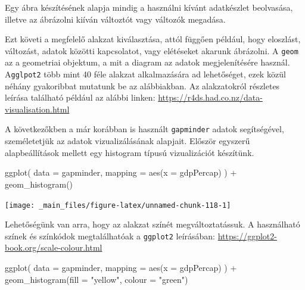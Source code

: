 \documentclass[
]{book}
\newenvironment{Shaded}{\begin{snugshade}}{\end{snugshade}}
\newcommand{\AttributeTok}[1]{\textcolor[rgb]{0.77,0.63,0.00}{#1}}
\newcommand{\FunctionTok}[1]{\textcolor[rgb]{0.00,0.00,0.00}{#1}}
\newcommand{\NormalTok}[1]{#1}
\newcommand{\SpecialCharTok}[1]{\textcolor[rgb]{0.00,0.00,0.00}{#1}}
\newcommand{\StringTok}[1]{\textcolor[rgb]{0.31,0.60,0.02}{#1}}
\begin{document}
Egy ábra készítésének alapja mindig a használni kívánt adatkészlet
beolvasása, illetve az ábrázolni kiíván változtót vagy változók
megadása.

Ezt követi a megfelelő alakzat kiválasztása, attól függően például, hogy
eloszlást, változást, adatok közötti kapcsolatot, vagy elétéseket
akarunk ábrázolni. A \texttt{geom} az a geometriai objektum, a mit a
diagram az adatok megjelenítésére használ. A\texttt{gglpot2} több mint
40 féle alakzat alkalmazására ad lehetőséget, ezek közül néhány
gyakoribbat mutatunk be az alábbiakban. Az alakzatokról részletes
leírása található például az alábbi linken:
\url{https://r4ds.had.co.nz/data-visualisation.html}

A következőkben a már korábban is használt \texttt{gapminder} adatok
segítségével, személetetjük az adatok vizualizálásának alapjait. Először
egyszerű alapbeállítások mellett egy histogram típusú vizualizációt
készítünk.

\begin{Shaded}
\begin{Highlighting}[]
\FunctionTok{ggplot}\NormalTok{(}
  \AttributeTok{data =}\NormalTok{ gapminder,}
  \AttributeTok{mapping =} \FunctionTok{aes}\NormalTok{(}\AttributeTok{x =}\NormalTok{ gdpPercap)}
\NormalTok{) }\SpecialCharTok{+}
  \FunctionTok{geom\_histogram}\NormalTok{()}
\end{Highlighting}
\end{Shaded}

\begin{center}\texttt{[image: \_main\_files/figure-latex/unnamed-chunk-118-1]} \end{center}

Lehetőségünk van arra, hogy az alakzat színét megváltoztatássuk. A
használható színek és színkódok megtalálhatóak a \texttt{ggplot2}
leírásában: \url{https://ggplot2-book.org/scale-colour.html}

\begin{Shaded}
\begin{Highlighting}[]
\FunctionTok{ggplot}\NormalTok{(}
  \AttributeTok{data =}\NormalTok{ gapminder,}
  \AttributeTok{mapping =} \FunctionTok{aes}\NormalTok{(}\AttributeTok{x =}\NormalTok{ gdpPercap)}
\NormalTok{) }\SpecialCharTok{+}
  \FunctionTok{geom\_histogram}\NormalTok{(}\AttributeTok{fill =} \StringTok{"yellow"}\NormalTok{, }\AttributeTok{colour =} \StringTok{"green"}\NormalTok{)}
\end{Highlighting}
\end{Shaded}
\end{document}
